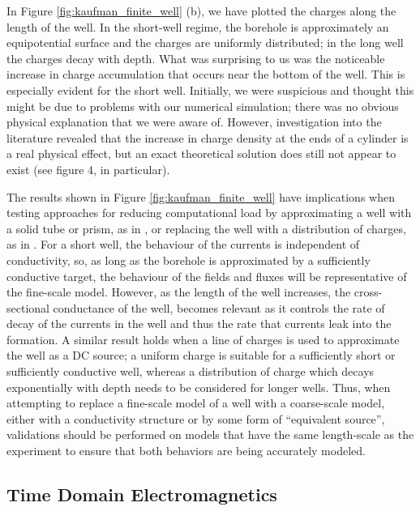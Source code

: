 In Figure \ref{fig:kaufman_finite_well} (b), we have plotted the charges along the length of the well. In the short-well regime, the borehole is approximately an equipotential surface and the charges are uniformly distributed; in the long well the charges decay with depth. What was surprising to us was the noticeable increase in charge accumulation that occurs near the bottom of the well. This is especially evident for the short well. Initially, we were suspicious and thought this might be due to problems with our numerical simulation; there was no obvious physical explanation that we were aware of. However, investigation into the literature revealed that the increase in charge density at the ends of a cylinder is a real physical effect, but an exact theoretical solution does still not appear to exist \citep{Griffiths1997} (see figure 4, in particular).

The results shown in Figure \ref{fig:kaufman_finite_well} have implications when testing approaches for reducing computational load by approximating a well with a solid tube or prism, as in \cite{Um2015}, or replacing the well with a distribution of charges, as in \cite{Weiss2016}. For a short well, the behaviour of the currents is independent of conductivity, so, as long as the borehole is approximated by a sufficiently conductive target, the behaviour of the fields and fluxes will be representative of the fine-scale model. However, as the length of the well increases, the cross-sectional conductance of the well, becomes relevant as it controls the rate of decay of the currents in the well and thus the rate that currents leak into the formation. A similar result holds when a line of charges is used to approximate the well as a DC source; a uniform charge is suitable for a sufficiently short or sufficiently conductive well, whereas a distribution of charge which decays exponentially with depth needs to be considered for longer wells. Thus, when attempting to replace a fine-scale model of a well with a coarse-scale model, either with a conductivity structure or by some form of ``equivalent source'', validations should be performed on models that have the same length-scale as the experiment to ensure that both behaviors are being accurately modeled.



\subsection{Time Domain Electromagnetics}
\label{sec:TDEM}

